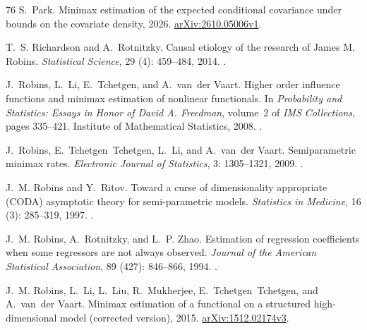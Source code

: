 \documentclass[12pt,oneside,openany]{book}
\numberwithin{equation}{chapter}
\theoremstyle{plain}
\theoremstyle{definition}
\theoremstyle{remark}
\begin{document}
\begin{thebibliography}{76}
S.~Park.
\newblock Minimax estimation of the expected conditional covariance under
  bounds on the covariate density, 2026.
\newblock \href{https://arxiv.org/abs/2610.05006v1}{arXiv:2610.05006v1}.

T.~S. Richardson and A.~Rotnitzky.
\newblock Causal etiology of the research of {James M. Robins}.
\newblock \emph{Statistical Science}, 29 (4): 459--484, 2014.
\newblock {}.

J.~Robins, L.~Li, E.~Tchetgen, and A.~van~der Vaart.
\newblock Higher order influence functions and minimax estimation of nonlinear
  functionals.
\newblock In \emph{Probability and Statistics: Essays in Honor of {David A.
  Freedman}}, volume~2 of \emph{IMS Collections}, pages 335--421. Institute of
  Mathematical Statistics, 2008.
\newblock {}.

J.~Robins, E.~Tchetgen~Tchetgen, L.~Li, and A.~van~der Vaart.
\newblock Semiparametric minimax rates.
\newblock \emph{Electronic Journal of Statistics}, 3: 1305--1321,
  2009.
\newblock {}.

J.~M. Robins and Y.~Ritov.
\newblock Toward a curse of dimensionality appropriate ({CODA}) asymptotic
  theory for semi-parametric models.
\newblock \emph{Statistics in Medicine}, 16 (3): 285--319,
  1997.
\newblock
  .

J.~M. Robins, A.~Rotnitzky, and L.~P. Zhao.
\newblock Estimation of regression coefficients when some regressors are not
  always observed.
\newblock \emph{Journal of the American Statistical Association}, 89
  (427): 846--866, 1994.
\newblock {}.

J.~M. Robins, L.~Li, L.~Liu, R.~Mukherjee, E.~Tchetgen~Tchetgen, and A.~van~der
  Vaart.
\newblock Minimax estimation of a functional on a structured high-dimensional
  model (corrected version), 2015.
\newblock \href{https://arxiv.org/abs/1512.02174v3}{arXiv:1512.02174v3}.


\end{thebibliography}
\end{document}
